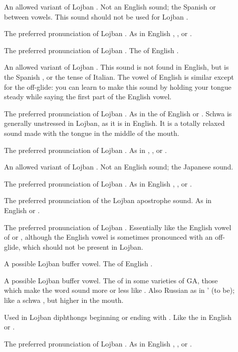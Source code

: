 \begin{description}
\item[] An allowed variant of Lojban . Not an English sound; the Spanish  or  between vowels. This sound should not be used for Lojban .
\item[] The preferred pronunciation of Lojban . As in English , , or .
\item[] The preferred pronunciation of Lojban . The  of English .
\item[] An allowed variant of Lojban . This sound is not found in English, but is the Spanish , or the tense  of Italian. The vowel of English  is similar except for the off-glide: you can learn to make this sound by holding your tongue steady while saying the first part of the English vowel.
\item[] The preferred pronunciation of Lojban . As in the  of English  or . Schwa is generally unstressed in Lojban, as it is in English. It is a totally relaxed sound made with the tongue in the middle of the mouth.
\item[] The preferred pronunciation of Lojban . As in , , or .
\item[] An allowed variant of Lojban . Not an English sound; the Japanese  sound.
\item[] The preferred pronunciation of Lojban . As in English , , or .
\item[] The preferred pronunciation of the Lojban apostrophe sound. As in English  or .
\item[] The preferred pronunciation of Lojban . Essentially like the English vowel of  or , although the English vowel is sometimes pronounced with an off-glide, which should not be present in Lojban.
\item[] A possible Lojban buffer vowel. The  of English .
\item[] A possible Lojban buffer vowel. The  of  in some varieties of GA, those which make the word sound more or less like . Also Russian  as in ' (to be); like a schwa , but higher in the mouth.
\item[] Used in Lojban diphthongs beginning or ending with . Like the  in English  or .
\item[] The preferred pronunciation of Lojban . As in English , , or .

\end{description}
